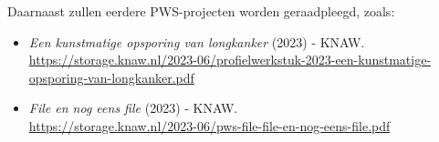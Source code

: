 \documentclass[a4paper,12pt]{article}
\begin{document}
Daarnaast zullen eerdere PWS-projecten worden geraadpleegd, zoals:
\begin{itemize}
    \item \textit{Een kunstmatige opsporing van longkanker} (2023) - KNAW. \\
          \url{https://storage.knaw.nl/2023-06/profielwerkstuk-2023-een-kunstmatige-opsporing-van-longkanker.pdf}
    \item \textit{File en nog eens file} (2023) - KNAW. \\
          \url{https://storage.knaw.nl/2023-06/pws-file-file-en-nog-eens-file.pdf}
\end{itemize}
\end{document}
